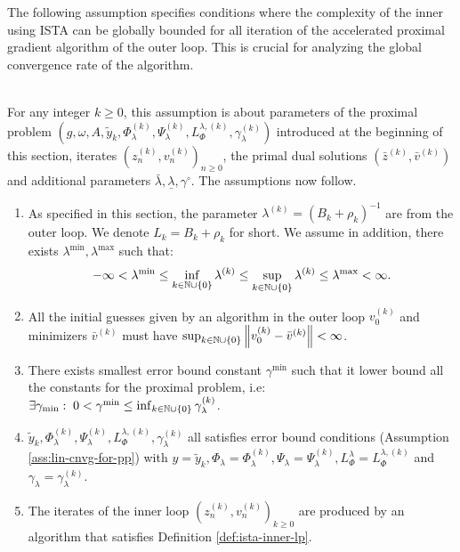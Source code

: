 \documentclass[12pt]{article}
\begin{document}
        \par
        The following assumption specifies conditions where the complexity of the inner using ISTA can be globally bounded for all iteration of the accelerated proximal gradient algorithm of the outer loop. 
        This is crucial for analyzing the global convergence rate of the algorithm. 
        \begin{assumption}\;\label{ass:bounded-inn-cmplx}\\
            For any integer $k \ge 0$, this assumption is about parameters of the proximal problem $\left(g, \omega, A, \tilde y_k, \Phi_\lambda^{(k)}, \Psi_\lambda^{(k)}, L^{\lambda, (k)}_{\Phi} ,\gamma_\lambda^{(k)}\right)$ introduced at the beginning of this section, iterates $\left(z_n^{(k)}, v_n^{(k)}\right)_{n\ge0}$, the primal dual solutions $\left(\bar z^{(k)}, \bar v^{(k)}\right)$ and additional parameters $\bar \lambda, \underline \lambda, \gamma^\circ$. 
            The assumptions now follow. 
            \begin{enumerate}[nosep]
                \item As specified in this section, the parameter $\lambda^{(k)} = (B_k + \rho_k)^{-1}$ are from the outer loop. We denote $L_k = B_k + \rho_k$ for short. We assume in addition, there exists $\lambda^{\min}, \lambda^{\max}$ such that: 
                $$
                    - \infty < \lambda^{\min} \le \inf_{k \in \mathbb N \cup \{0\}} \lambda^{(k)} \le \sup_{k \in \mathbb N \cup \{0\}} \lambda^{(k)} \le \lambda^{\max} < \infty. 
                $$ 
                \item All the initial guesses given by an algorithm in the outer loop $v_0^{(k)}$ and minimizers $\bar v^{(k)}$ must have $\sup_{k \in \mathbb N \cup \{0\}}\left\Vert v_0^{(k)} - \bar v^{(k)}\right\Vert < \infty$. 
                \item There exists smallest error bound constant $\gamma^{\min}$ such that it lower bound all the constants for the proximal problem, i.e: $\exists \gamma_{\min}:\;0 < \gamma^{\min} \le \inf_{k \in \mathbb N \cup \{0\}} \gamma^{(k)}_\lambda$. 
                \item $\tilde y_k, \Phi_\lambda^{(k)}, \Psi_\lambda^{(k)}, L^{\lambda, (k)}_{\Phi} ,\gamma_\lambda^{(k)}$ all satisfies error bound conditions (Assumption \ref{ass:lin-cnvg-for-pp}) with $y = \tilde y_k, \Phi_\lambda = \Phi_\lambda^{(k)}, \Psi_\lambda = \Psi_\lambda^{(k)}, L_\Phi^\lambda = L^{\lambda, (k)}_{\Phi}$ and $\gamma_\lambda = \gamma_\lambda^{(k)}$. 
                \item The iterates of the inner loop $(z_n^{(k)}, v_n^{(k)})_{k \ge 0}$ are produced by an algorithm that satisfies Definition \ref{def:ista-inner-lp}. 
            \end{enumerate}
        \end{assumption}
\end{document}
